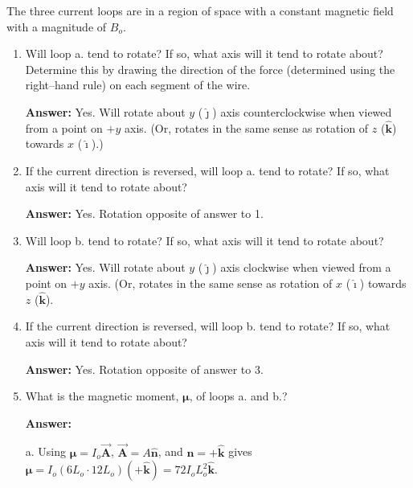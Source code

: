 \documentclass{article}
\newcommand{\ihat}[0]{\hat{\boldsymbol{\imath}}}
\newcommand{\jhat}[0]{\hat{\boldsymbol{\jmath}}}
\newcommand{\khat}[0]{\hat{\boldsymbol{k}}}
\newcommand{\bfvec}[1]{\vec{\mathbf{#1}}}
\begin{document}
\ifsolutions

\else


\fi

The three current loops are in a region of space with a constant magnetic field with a magnitude of $B_o$.

\begin{enumerate}

  \item Will loop a. tend to rotate? If so, what axis will it tend to rotate about? Determine this by drawing the direction of the force (determined using the right--hand rule) on each segment of the wire.

        \ifsolutions
        {\bf Answer: }Yes. Will rotate about $y$ ($\jhat$) axis counterclockwise when viewed from a point on $+y$ axis. (Or, rotates in the same sense as rotation of $z$ ($\khat$) towards $x$ ($\ihat$).)
        \else
        \vskip 56.25pt
        \fi

  \item If the current direction is reversed, will loop a. tend to rotate? If so, what axis will it tend to rotate about?

        \ifsolutions
        {\bf Answer: } Yes. Rotation opposite of answer to 1.
        \else
        \vskip 56.25pt
        \fi

  \item Will loop b. tend to rotate? If so, what axis will it tend to rotate about?

        \ifsolutions
        {\bf Answer:} Yes. Will rotate about $y$ ($\jhat$) axis clockwise when viewed from a point on $+y$ axis. (Or, rotates in the same sense as rotation of $x$ ($\ihat$) towards $z$ ($\khat$).
        \else
        \vskip 56.25pt
        \fi

  \item If the current direction is reversed, will loop b. tend to rotate? If so, what axis will it tend to rotate about?

        \ifsolutions
        {\bf Answer: } Yes. Rotation opposite of answer to 3.
        \else
        \vskip 56.25pt
        \fi

  \item What is the magnetic moment, $\boldsymbol{\mu}$, of loops a. and b.?

        \ifsolutions
        {\bf Answer:} 

        a. Using $\boldsymbol{\mu} = I_o\bfvec{A}$, $\bfvec{A} = A\hat{\mathbf{n}}$, and $\hat{\mathbf{n}} = +\khat$ gives $\boldsymbol{\mu } = I_o(6L_o\cdot 12 L_o)(+\khat) = 72I_oL_o^2\khat$.


\end{enumerate}
\end{document}
